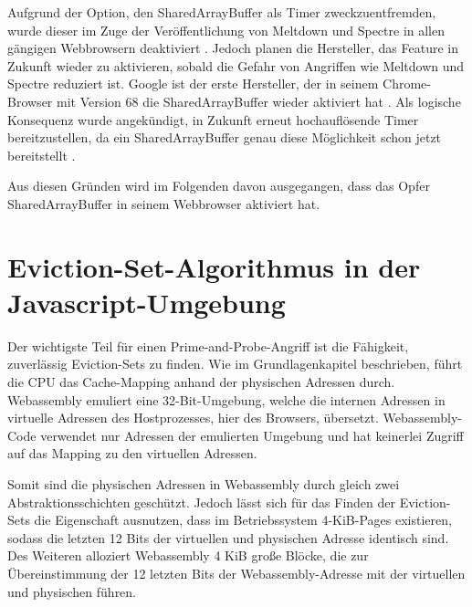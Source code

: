 Aufgrund der Option, den SharedArrayBuffer als Timer zweckzuentfremden, wurde dieser im Zuge der Veröffentlichung von Meltdown und Spectre in allen gängigen Webbrowsern deaktiviert \cite{FirefoxSharedArrayBuffer}. Jedoch planen die Hersteller, das Feature in Zukunft wieder zu aktivieren, sobald die Gefahr von Angriffen wie Meltdown und Spectre reduziert ist. 
Google ist der erste Hersteller, der in seinem Chrome-Browser mit Version 68 die SharedArrayBuffer wieder aktiviert hat \cite{ChromeSharedArrayBufferAgain}. 
Als logische Konsequenz wurde angekündigt, in Zukunft erneut hochauflösende Timer bereitzustellen, da ein SharedArrayBuffer genau diese Möglichkeit schon jetzt bereitstellt \cite{ChromeHighResolutionTimerAgain}.

Aus diesen Gründen wird im Folgenden davon ausgegangen, dass das Opfer SharedArrayBuffer in seinem Webbrowser aktiviert hat.


\section{Eviction-Set-Algorithmus in der Javascript-Umgebung}
Der wichtigste Teil für einen Prime-and-Probe-Angriff ist die Fähigkeit, zuverlässig Eviction-Sets zu finden. Wie im Grundlagenkapitel beschrieben, führt die CPU das Cache-Mapping anhand der physischen Adressen durch. Webassembly emuliert eine 32-Bit-Umgebung, welche die internen Adressen in virtuelle Adressen des Hostprozesses, hier des Browsers, übersetzt. 
Webassembly-Code verwendet nur Adressen der emulierten Umgebung und hat keinerlei Zugriff auf das Mapping zu den virtuellen Adressen. 

Somit sind die physischen Adressen in Webassembly durch gleich zwei Abstraktionsschichten geschützt. 
Jedoch lässt sich für das Finden der Eviction-Sets die Eigenschaft ausnutzen, dass im Betriebssystem 4-KiB-Pages existieren, sodass die letzten 12 Bits der virtuellen und physischen Adresse identisch sind. 
Des Weiteren alloziert %
Webassembly 4 KiB große Blöcke, die zur Übereinstimmung der 12 letzten Bits der Webassembly-Adresse mit der virtuellen und physischen führen.

